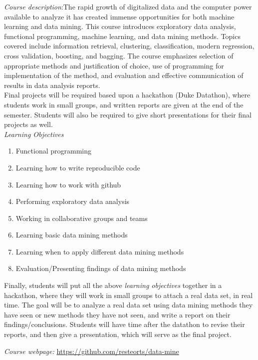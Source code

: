 \documentclass[11pt]{article}
\begin{document}
\emph{Course description}:The rapid growth of digitalized data and the computer power available to analyze it has created immense opportunities for both machine learning and data mining. This course introduces exploratory data analysis, functional programming, machine learning, and data mining methods. Topics covered include information retrieval, clustering, classification, modern regression, cross validation, boosting, and bagging. The course emphasizes selection of appropriate methods and justification of choice, use of programming for implementation of the method, and evaluation and effective communication of results in data analysis reports. \\

Final projects will be required based upon a hackathon (Duke Datathon), where students work in small groups, and written reports are given at the end of the semester. Students will also be required to give short presentations for their final projects as well. \\

\emph{Learning Objectives}
\begin{enumerate}
\item Functional programming
\item Learning how to write reproducible code
\item Learning how to work with github 
\item Performing exploratory data analysis 
\item Working in collaborative groups and teams
\item Learning basic data mining methods
\item Learning when to apply different data mining methods
\item Evaluation/Presenting findings of data mining methods
\end{enumerate}

Finally, students will put all the above \emph{learning objectives} together in a hackathon, where they will work in small groups to attach a real data set, in real time. The goal will be to analyze a real data set using data mining methods they have seen or new methods they have not seen, and write a report on their findings/conclusions. Students will have time after the datathon to revise their reports, and then give a presentation, which will serve as the final project.


\emph{Course webpage:} \url{https://github.com/resteorts/data-mine} \\
\end{document}
